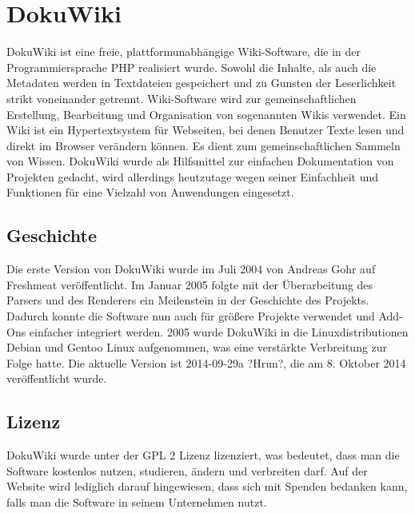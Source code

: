 \documentclass[a4paper, 12pt]{article}
\begin{document}
\section*{DokuWiki}
DokuWiki ist eine freie, plattformunabhängige Wiki-Software, die in der Programmiersprache PHP realisiert wurde. Sowohl die Inhalte, als auch die Metadaten werden in Textdateien gespeichert und zu Gunsten der Leserlichkeit strikt voneinander getrennt. Wiki-Software wird zur gemeinschaftlichen Erstellung, Bearbeitung und Organisation von sogenannten Wikis verwendet. Ein Wiki ist ein Hypertextsystem für Webseiten, bei denen Benutzer Texte lesen und direkt im Browser verändern können. Es dient zum gemeinschaftlichen Sammeln von Wissen. DokuWiki wurde als Hilfsmittel zur einfachen Dokumentation von Projekten gedacht, wird allerdings heutzutage wegen seiner Einfachheit und Funktionen für eine Vielzahl von Anwendungen eingesetzt.
\subsection*{Geschichte}
Die erste Version von DokuWiki wurde im Juli 2004 von Andreas Gohr auf Freshmeat veröffentlicht. Im Januar 2005 folgte mit der Überarbeitung des Parsers und des Renderers ein Meilenstein in der Geschichte des Projekts. Dadurch konnte die Software nun auch für größere Projekte verwendet und Add-Ons einfacher integriert werden. 2005 wurde DokuWiki in die Linuxdistributionen Debian und Gentoo Linux aufgenommen, was eine verstärkte Verbreitung zur Folge hatte. Die aktuelle Version ist 2014-09-29a ?Hrun?, die am 8. Oktober 2014 veröffentlicht wurde.
\subsection*{Lizenz}
DokuWiki wurde unter der GPL 2 Lizenz lizenziert, was bedeutet, dass man die Software kostenlos nutzen, studieren, ändern und verbreiten darf. Auf der Website wird lediglich darauf hingewiesen, dass sich mit Spenden bedanken kann, falls man die Software in seinem Unternehmen nutzt.
\end{document}
